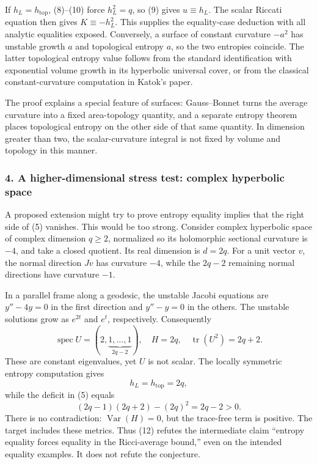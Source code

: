 \documentclass[11pt]{article}
\begin{document}
If $h_L=h_{\mathrm{top}}$, (8)--(10) force $h_L^2=q$, so (9) gives $u\equiv h_L$. The scalar Riccati equation then gives $K\equiv-h_L^2$. This supplies the equality-case deduction with all analytic equalities exposed. Conversely, a surface of constant curvature $-a^2$ has unstable growth $a$ and topological entropy $a$, so the two entropies coincide. The latter topological entropy value follows from the standard identification with exponential volume growth in its hyperbolic universal cover, or from the classical constant-curvature computation in Katok's paper.

The proof explains a special feature of surfaces: Gauss--Bonnet turns the average curvature into a fixed area-topology quantity, and a separate entropy theorem places topological entropy on the other side of that same quantity. In dimension greater than two, the scalar-curvature integral is not fixed by volume and topology in this manner.

\subsubsection{4. A higher-dimensional stress test: complex hyperbolic space}
A proposed extension might try to prove entropy equality implies that the right side of (5) vanishes. This would be too strong. Consider complex hyperbolic space of complex dimension $q\geq2$, normalized so its holomorphic sectional curvature is $-4$, and take a closed quotient. Its real dimension is $d=2q$. For a unit vector $v$, the normal direction $Jv$ has curvature $-4$, while the $2q-2$ remaining normal directions have curvature $-1$.

In a parallel frame along a geodesic, the unstable Jacobi equations are $y''-4y=0$ in the first direction and $y''-y=0$ in the others. The unstable solutions grow as $e^{2t}$ and $e^t$, respectively. Consequently
\[
 \operatorname{spec}U=(2,\underbrace{1,\ldots,1}_{2q-2}),
 \quad H=2q,\quad\operatorname{tr}(U^2)=2q+2.             \tag{11}
\]
These are constant eigenvalues, yet $U$ is not scalar. The locally symmetric entropy computation gives
\[
 h_L=h_{\mathrm{top}}=2q,
\]
while the deficit in (5) equals
\[
 (2q-1)(2q+2)-(2q)^2=2q-2>0.                            \tag{12}
\]
There is no contradiction: $\operatorname{Var}(H)=0$, but the trace-free term is positive. The target includes these metrics. Thus (12) refutes the intermediate claim ``entropy equality forces equality in the Ricci-average bound,'' even on the intended equality examples. It does not refute the conjecture.
\end{document}
